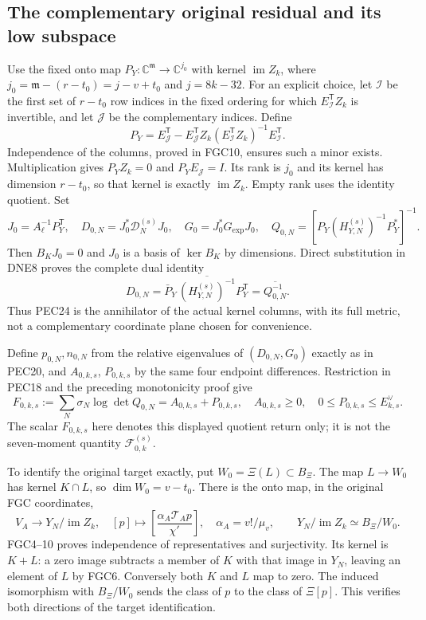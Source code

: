\documentclass[11pt,a4paper]{article}
\begin{document}
\subsection{The complementary original residual and its low subspace}
Use the fixed onto map $P_Y:\mathbb C^{\mathfrak m}\to\mathbb C^{j_0}$
with kernel $\operatorname{im}Z_k$, where
$j_0=\mathfrak m-(r-t_0)=j-v+t_0$ and $j=8k-32$.
For an explicit choice, let $\mathcal I$ be the first set of $r-t_0$
row indices in the fixed ordering for which $E_{\mathcal I}^{\mathsf T}Z_k$
is invertible, and let $\mathcal J$ be the complementary indices. Define
\[
 P_Y=E_{\mathcal J}^{\mathsf T}
       -E_{\mathcal J}^{\mathsf T}Z_k
        (E_{\mathcal I}^{\mathsf T}Z_k)^{-1}E_{\mathcal I}^{\mathsf T}.
\]
Independence of the columns, proved in FGC10, ensures such a minor exists.
Multiplication gives $P_YZ_k=0$ and $P_YE_{\mathcal J}=I$.
Its rank is $j_0$ and its kernel has dimension $r-t_0$, so that kernel
is exactly $\operatorname{im}Z_k$. Empty rank uses the identity quotient.
Set
\[
 J_0=A_\ell^{-1}P_Y^{\mathsf T},\quad
 D_{0,N}=J_0^*\mathcal D_N^{(s)}J_0,\quad G_0=J_0^*G_{\exp}J_0,
 \quad Q_{0,N}=[P_Y(H_{Y,N}^{(s)})^{-1}P_Y^*]^{-1}.
 \tag{PEC24}
\]
Then $B_KJ_0=0$ and $J_0$ is a basis of $\ker B_K$ by dimensions.
Direct substitution in DNE8 proves the complete dual identity
\[
 D_{0,N}=\bar P_Y\,\overline{(H_{Y,N}^{(s)})^{-1}}P_Y^{\mathsf T}
        =\overline{Q_{0,N}^{-1}}.
 \tag{PEC25}
\]
Thus PEC24 is the annihilator of the actual kernel columns, with its
full metric, not a complementary coordinate plane chosen for convenience.

Define $p_{0,N},n_{0,N}$ from the relative eigenvalues of $(D_{0,N},G_0)$
exactly as in PEC20, and $A_{0,k,s}$, $P_{0,k,s}$ by the same four
endpoint differences. Restriction in PEC18 and the preceding monotonicity
proof give
\[
 F_{0,k,s}:=\sum_N\sigma_N\log\det Q_{0,N}
     =A_{0,k,s}+P_{0,k,s},\quad
 A_{0,k,s}\ge0,\quad0\le P_{0,k,s}\le E_{k,s}^{\vee}.
 \tag{PEC26}
\]
The scalar $F_{0,k,s}$ here denotes this displayed quotient return only;
it is not the seven-moment quantity $\mathcal F_{0,k}^{(s)}$.

To identify the original target exactly, put $W_0=\Xi(L)\subset B_\Xi$.
The map $L\to W_0$ has kernel $K\cap L$, so $\dim W_0=v-t_0$.
There is the onto map, in the original FGC coordinates,
\[
 V_A\longrightarrow Y_N/\operatorname{im}Z_k,
 \quad[p]\longmapsto
 \left[\frac{\alpha_A\mathcal T_Ap}{\chi'}\right],
 \quad\alpha_A=v!/\mu_v,
 \qquad Y_N/\operatorname{im}Z_k\simeq B_\Xi/W_0.
 \tag{PEC27}
\]
FGC4--10 proves independence of representatives and surjectivity.
Its kernel is $K+L$: a zero image subtracts a member of $K$ with
that image in $Y_N$, leaving an element of $L$ by FGC6. Conversely
both $K$ and $L$ map to zero. The induced isomorphism with $B_\Xi/W_0$
sends the class of $p$ to the class of $\Xi[p]$. This verifies both
directions of the target identification.
\end{document}
